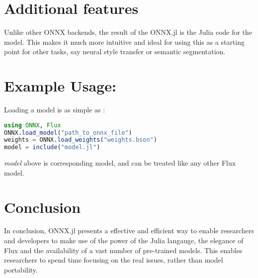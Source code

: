 \documentclass{juliacon}
\begin{document}
\section{Additional features}

Unlike other ONNX backends, the result of the ONNX.jl is the Julia code for the model. This makes it much more intuitive and ideal for using this as a starting point for other tasks, say neural style transfer or semantic segmentation.

\section{Example Usage:}

Loading a model is as simple as :

\begin{lstlisting}[language=Julia]
using ONNX, Flux
ONNX.load_model("path_to_onnx_file")
weights = ONNX.load_weights("weights.bson")
model = include("model.jl")
\end{lstlisting}{}

\textit{model} above is corresponding model, and can be treated like any other Flux model. 

\section{Conclusion}
In conclusion, ONNX.jl presents a effective and efficient way to enable researchers and developers to make use of the power of the Julia langauge, the elegance of Flux and the availability of a vast number of pre-trained models. This enables researchers to spend time focusing on the real issues, rather than model portability.



\end{document}
